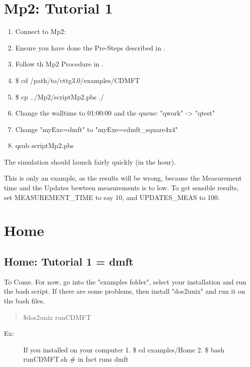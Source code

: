 \documentclass[letterpaper,10pt,english]{sphinxmanual}
\begin{document}
\section{Mp2: Tutorial 1}
\label{\detokenize{tutorial:mp2-tutorial-1}}\begin{enumerate}
\item {} 
Connect to Mp2:

\item {} 
Ensure you have done the Pre-Steps described in {\hyperref[\detokenize{installation:installation}]{}}.

\item {} 
Follow th Mp2 Procedure in {\hyperref[\detokenize{installation:installation}]{}}.

\item {} 
\$ cd /path/to/cttg3.0/examples/CDMFT

\item {} 
\$ cp ../Mp2/scriptMp2.pbs ./

\item {} 
Change the walltime to 01:00:00 and the queue: "qwork" -\textgreater{} "qtest"

\item {} 
Change "myExe=dmft" to "myExe=cdmft\_square4x4"

\item {} 
qsub scriptMp2.pbs

\end{enumerate}

The simulation should launch fairly quickly (in the hour).

This is  only an example, as the results will be wrong, because the
Measurement time and the Updates bewteen measurements is to low.
To get sensible results, set MEASUREMENT\_TIME to say 10, and UPDATES\_MEAS
to 100.


\section{Home}
\label{\detokenize{tutorial:home}}

\subsection{Home: Tutorial 1 = dmft}
\label{\detokenize{tutorial:home-tutorial-1-dmft}}
To Come. For now, go into the "examples folder", select your installation and run the bash script.
If there are some problems, then install "dos2unix" and run it on the bash files.
\begin{quote}

\$dos2unix runCDMFT
\end{quote}
\begin{description}
\item[{Ex:}] \leavevmode
If you installed on your computer
1. \$ cd examples/Home
2. \$ bash runCDMFT.sh \# in fact runs dmft

\end{description}
\end{document}
